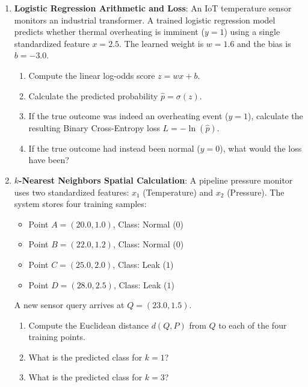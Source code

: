\begin{checkyourself}
\begin{enumerate}
    \item \textbf{Logistic Regression Arithmetic and Loss}:
    An IoT temperature sensor monitors an industrial transformer. A trained logistic regression model predicts whether thermal overheating is imminent ($y=1$) using a single standardized feature $x = 2.5$. The learned weight is $w = 1.6$ and the bias is $b = -3.0$.
    \begin{enumerate}[label=(\alph*)]
        \item Compute the linear log-odds score $z = w x + b$.
        \item Calculate the predicted probability $\hat{p} = \sigma(z)$.
        \item If the true outcome was indeed an overheating event ($y = 1$), calculate the resulting Binary Cross-Entropy loss $L = -\ln(\hat{p})$.
        \item If the true outcome had instead been normal ($y = 0$), what would the loss have been?
    \end{enumerate}

    \item \textbf{$k$-Nearest Neighbors Spatial Calculation}:
    A pipeline pressure monitor uses two standardized features: $x_1$ (Temperature) and $x_2$ (Pressure). The system stores four training samples:
    \begin{itemize}
        \item Point $A = (20.0, 1.0)$, Class: Normal ($0$)
        \item Point $B = (22.0, 1.2)$, Class: Normal ($0$)
        \item Point $C = (25.0, 2.0)$, Class: Leak ($1$)
        \item Point $D = (28.0, 2.5)$, Class: Leak ($1$)
    \end{itemize}
    A new sensor query arrives at $Q = (23.0, 1.5)$.
    \begin{enumerate}[label=(\alph*)]
        \item Compute the Euclidean distance $d(Q, P)$ from $Q$ to each of the four training points.
        \item What is the predicted class for $k = 1$?
        \item What is the predicted class for $k = 3$?
    \end{enumerate}


\end{enumerate}
\end{checkyourself}
